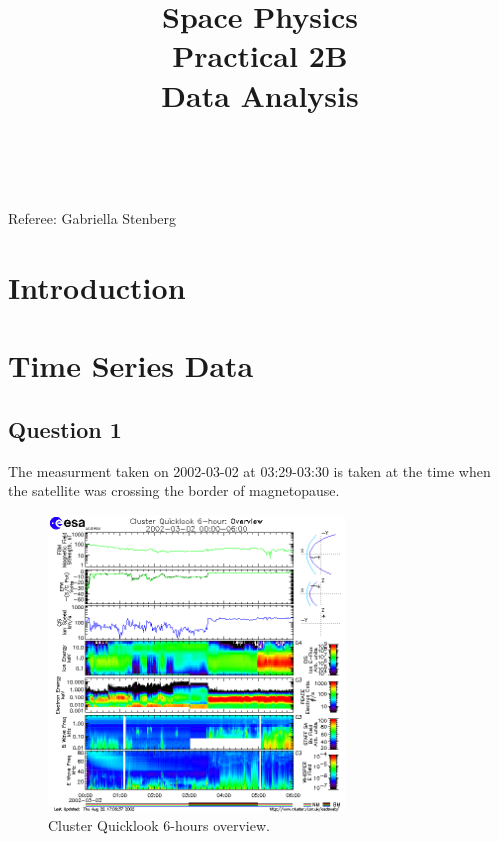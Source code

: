 \documentclass{article}
\title{\textbf {Space Physics} \\ Practical 2B\\ Data Analysis} %
\author{\authorivan\\\authoranu}
\begin{document}
\maketitle %

\centerline{Referee: Gabriella Stenberg}

\setlength\parindent{0pt} %

\renewcommand{\labelenumi}{\alph{enumi}} %
\clearpage

\tableofcontents

\listoffigures

\clearpage

\section{Introduction}

    

\section{Time Series Data}

\subsection{Question 1}
The measurment taken on 2002-03-02 at 03:29-03:30 is taken at the time when the satellite was crossing the border of magnetopause.

\begin{figure}[htb]
\centering
\includegraphics[width=0.7\textwidth]{Figures/cluster.png}
\caption{Cluster Quicklook 6-hours overview.}
\label{fig:cluster}
\end{figure}
\end{document}
